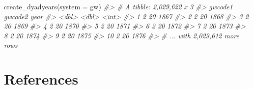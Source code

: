\documentclass[
  11pt,
]{article}
\newenvironment{Shaded}{\begin{snugshade}}{\end{snugshade}}
\newcommand{\AttributeTok}[1]{\textcolor[rgb]{0.77,0.63,0.00}{#1}}
\newcommand{\CommentTok}[1]{\textcolor[rgb]{0.56,0.35,0.01}{\textit{#1}}}
\newcommand{\FunctionTok}[1]{\textcolor[rgb]{0.00,0.00,0.00}{#1}}
\newcommand{\NormalTok}[1]{#1}
\newcommand{\StringTok}[1]{\textcolor[rgb]{0.31,0.60,0.02}{#1}}
\begin{document}
\newpage

\begin{Shaded}
\begin{Highlighting}[]
\FunctionTok{create\_dyadyears}\NormalTok{(}\AttributeTok{system =} \StringTok{\textquotesingle{}gw\textquotesingle{}}\NormalTok{)}
\CommentTok{\#\textgreater{} \# A tibble: 2,029,622 x 3}
\CommentTok{\#\textgreater{}    gwcode1 gwcode2  year}
\CommentTok{\#\textgreater{}      \textless{}dbl\textgreater{}   \textless{}dbl\textgreater{} \textless{}int\textgreater{}}
\CommentTok{\#\textgreater{}  1       2      20  1867}
\CommentTok{\#\textgreater{}  2       2      20  1868}
\CommentTok{\#\textgreater{}  3       2      20  1869}
\CommentTok{\#\textgreater{}  4       2      20  1870}
\CommentTok{\#\textgreater{}  5       2      20  1871}
\CommentTok{\#\textgreater{}  6       2      20  1872}
\CommentTok{\#\textgreater{}  7       2      20  1873}
\CommentTok{\#\textgreater{}  8       2      20  1874}
\CommentTok{\#\textgreater{}  9       2      20  1875}
\CommentTok{\#\textgreater{} 10       2      20  1876}
\CommentTok{\#\textgreater{} \# ... with 2,029,612 more rows}
\end{Highlighting}
\end{Shaded}

\hypertarget{references}{%
\section{References}\label{references}}

\setlength{\parskip}{6pt}
\end{document}
